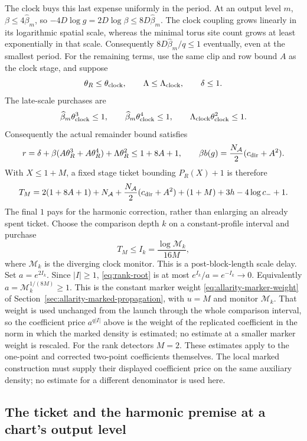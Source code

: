 The clock buys this last expense uniformly in the period. At an output
level $m$, $\beta\le4\widehat\beta_m$, so
$-4D\log g=2D\log\beta\le8D\widehat\beta_m$.
The clock coupling grows linearly in its logarithmic spatial scale,
whereas the minimal torus site count grows at least exponentially in
that scale. Consequently $8D\widehat\beta_m/q\le1$ eventually, even
at the smallest period. For the remaining terms, use the same clip and row bound $A$ as the
clock stage, and suppose
\[
 \theta_R\le\theta_{\rm clock},\qquad
 \Lambda\le\Lambda_{\rm clock},\qquad \delta\le1.
\]
The late-scale purchases are
\[
 \widehat\beta_m\theta_{\rm clock}^{3}\le1,\qquad
 \widehat\beta_m\theta_{\rm clock}^{4}\le1,\qquad
 \Lambda_{\rm clock}\theta_{\rm clock}^{2}\le1.
\]
Consequently the actual remainder bound satisfies
\[
 r=\delta+\beta(A\theta_R^3+A\theta_R^4)
                     +\Lambda\theta_R^2
       \le1+8A+1,
 \qquad
 \beta b(g)=\frac{N_{\mathcal A}}2(c_{\rm dir}+A^2).
\]
With $X\le1+M$, a fixed stage ticket bounding $P_R(X)+1$ is therefore
\[
 T_M=2(1+8A+1)+N_{\mathcal A}
       +\frac{N_{\mathcal A}}2(c_{\rm dir}+A^2)
       +(1+M)+3h-4\log c_-+1.
\]
The final $1$ pays for the harmonic correction, rather than enlarging
an already spent ticket. Choose the comparison depth $k$ on a
constant-profile interval and purchase
\[
 T_M\le I_k=\frac{\log \mathcal M_k}{16M},
\]
where $\mathcal M_k$ is the diverging clock monitor. This is a
post-block-length scale delay. Set $a=e^{2I_k}$. Since $|I|\ge1$,
\eqref{eq:rank-root} is at most $e^{I_k}/a=e^{-I_k}\to0$.
Equivalently $a=\mathcal M_k^{1/(8M)}\ge1$. This is the constant
marker weight \eqref{eq:allarity-marker-weight} of
Section~\ref{sec:allarity-marked-propagation}, with $u=M$ and monitor
$\mathcal M_k$. That weight is used unchanged from the launch through
the whole comparison interval, so the coefficient price $a^{q|I|}$
above is the weight of the replicated coefficient in the norm in
which the marked density is estimated; no estimate at a smaller
marker weight is rescaled.
For the rank detectors $M=2$. These estimates apply to the one-point
and corrected two-point coefficients themselves. The local marked
construction must supply their displayed coefficient price on the
same auxiliary density; no estimate for a different denominator is
used here.

\subsection{The ticket and the harmonic premise at a chart's output level}
\label{subsec:rank-root-output-ticket}

